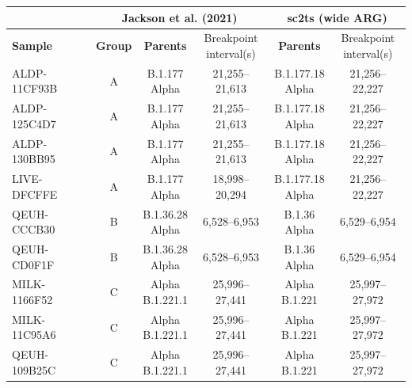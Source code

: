 \documentclass{article}
\begin{document}
\begin{table}
\centering
\begin{tabular}{l|c|c|c|c|c}
\hline
\multicolumn{1}{c}{} & \multicolumn{3}{c}{\textbf{Jackson et al. (2021)}} & \multicolumn{2}{c}{\textbf{sc2ts (wide ARG)}} \\
\hline
\textbf{Sample} & \textbf{Group} & \textbf{Parents} & \thead{Breakpoint \\ interval(s)} & \textbf{Parents} & \thead{Breakpoint \\ interval(s)} \\
\hline
ALDP-11CF93B & A & \thead{B.1.177 \\ Alpha} & 21,255–21,613 & \thead{B.1.177.18 \\ Alpha} & 21,256–22,227 \\
ALDP-125C4D7 & A & \thead{B.1.177 \\ Alpha} & 21,255–21,613 & \thead{B.1.177.18 \\ Alpha} & 21,256–22,227 \\
ALDP-130BB95 & A & \thead{B.1.177 \\ Alpha} & 21,255–21,613 & \thead{B.1.177.18 \\ Alpha} & 21,256–22,227 \\
LIVE-DFCFFE & A & \thead{B.1.177 \\ Alpha} & 18,998–20,294 & \thead{B.1.177.18 \\ Alpha} & 21,256–22,227 \\
QEUH-CCCB30 & B & \thead{B.1.36.28 \\ Alpha} & 6,528–6,953 & \thead{B.1.36 \\ Alpha} & 6,529–6,954 \\
QEUH-CD0F1F & B & \thead{B.1.36.28 \\ Alpha} & 6,528–6,953 & \thead{B.1.36 \\ Alpha} & 6,529–6,954 \\
MILK-1166F52 & C & \thead{Alpha \\ B.1.221.1} & 25,996–27,441 & \thead{Alpha \\ B.1.221} & 25,997–27,972 \\
MILK-11C95A6 & C & \thead{Alpha \\ B.1.221.1} & 25,996–27,441 & \thead{Alpha \\ B.1.221} & 25,997–27,972 \\
QEUH-109B25C & C & \thead{Alpha \\ B.1.221.1} & 25,996–27,441 & \thead{Alpha \\ B.1.221} & 25,997–27,972 \\

\end{tabular}
\end{table}
\end{document}
